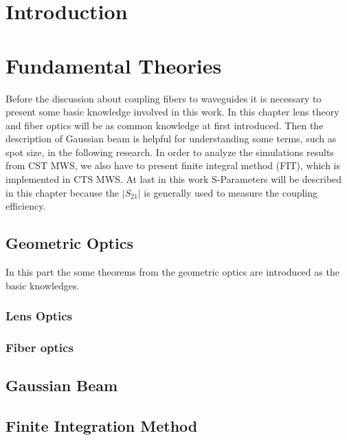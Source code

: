 
\chapter{Introduction}



\chapter{Fundamental Theories}
\label{chp:background}
Before the discussion about coupling fibers to waveguides it is necessary to present some basic knowledge involved in this work.  In this chapter lens theory and fiber optics will be as common knowledge at first introduced. Then the description of Gaussian beam is helpful for understanding some terms, such as spot size, in the following research.  
In order to analyze the simulations results from CST MWS, we also have to present finite integral method (FIT), which is implemented in CTS MWS. At last in this work S-Parameters will be described in this chapter because the $|S_{21}|$ is generally used to measure the coupling efficiency. 

\section{Geometric Optics}
\label{sect:background_optics}
In this part the  some theorems from the geometric optics  are introduced as the basic knowledges.
\subsection{Lens Optics}

\subsection{Fiber optics}


\section{Gaussian Beam}
\label{sect:gaussian_beam}


\section{Finite Integration Method}



